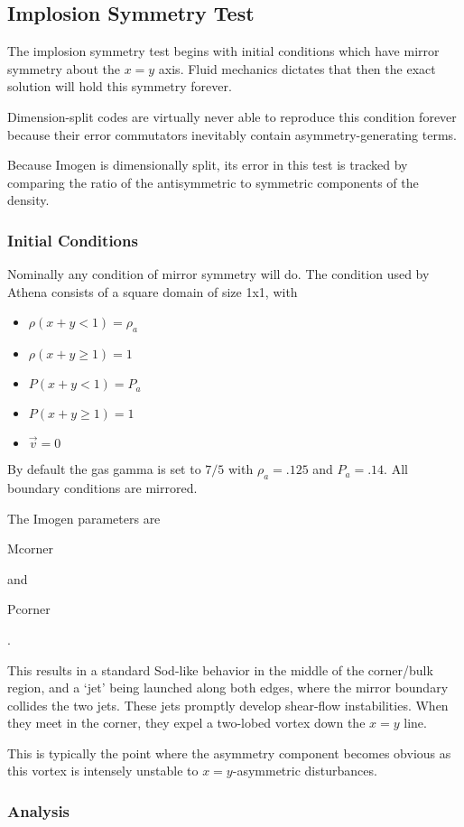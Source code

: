 
\subsection{Implosion Symmetry Test}

The implosion symmetry test begins with initial conditions which have mirror symmetry
about the $x=y$ axis. Fluid mechanics dictates that then the exact solution will 
hold this symmetry forever.

Dimension-split codes are virtually never able to reproduce this condition forever
because their error commutators inevitably contain asymmetry-generating terms.

Because Imogen is dimensionally split, its error in this test is tracked by comparing
the ratio of the antisymmetric to symmetric components of the density.

\subsubsection{Initial Conditions}

Nominally any condition of mirror symmetry will do. The condition used by Athena consists of
a square domain of size 1x1, with
\begin{itemize}
\item $\rho(x+y < 1) = \rho_a$
\item $\rho(x+y \ge 1) = 1$
\item $P(x+y < 1) = P_a$
\item $P(x+y \ge 1) = 1$
\item $\vec{v} = 0$
\end{itemize}
By default the gas gamma is set to $7/5$ with $\rho_a = .125$ and $P_a = .14$.
All boundary conditions are mirrored.

The Imogen parameters are \begin{tt}Mcorner\end{tt} and \begin{tt}Pcorner\end{tt}.

This results in a standard Sod-like behavior in the middle of the corner/bulk region,
and a `jet' being launched along both edges, where the mirror boundary collides the two jets.
These jets promptly develop shear-flow instabilities. When they meet in the corner, they 
expel a two-lobed vortex down the $x=y$ line.

This is typically the point where the asymmetry component becomes obvious as this vortex is
intensely unstable to $x=y$-asymmetric disturbances.

\subsubsection{Analysis}



